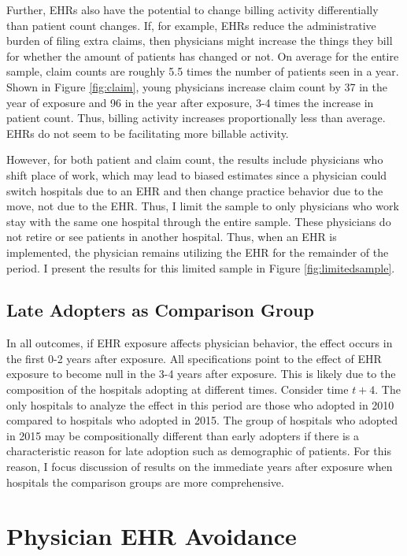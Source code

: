 \documentclass[11pt]{article}
\begin{document}
Further, EHRs also have the potential to change billing activity differentially than patient count changes. If, for example, EHRs reduce the administrative burden of filing extra claims, then physicians might increase the things they bill for whether the amount of patients has changed or not. On average for the entire sample, claim counts are roughly 5.5 times the number of patients seen in a year. Shown in Figure \ref{fig:claim}, young physicians increase claim count by 37 in the year of exposure and 96 in the year after exposure, 3-4 times the increase in patient count. Thus, billing activity increases proportionally less than average. EHRs do not seem to be facilitating more billable activity. 

However, for both patient and claim count, the results include physicians who shift place of work, which may lead to biased estimates since a physician could switch hospitals due to an EHR and then change practice behavior due to the move, not due to the EHR. Thus, I limit the sample to only physicians who work stay with the same one hospital through the entire sample. These physicians do not retire or see patients in another hospital. Thus, when an EHR is implemented, the physician remains utilizing the EHR for the remainder of the period. I present the results for this limited sample in Figure \ref{fig:limitedsample}. 


\subsection{Late Adopters as Comparison Group}

In all outcomes, if EHR exposure affects physician behavior, the effect occurs in the first 0-2 years after exposure. All specifications point to the effect of EHR exposure to become null in the 3-4 years after exposure. This is likely due to the composition of the hospitals adopting at different times. Consider time $t+4$. The only hospitals to analyze the effect in this period are those who adopted in 2010 compared to hospitals who adopted in 2015. The group of hospitals who adopted in 2015 may be compositionally different than early adopters if there is a characteristic reason for late adoption such as demographic of patients. For this reason, I focus discussion of results on the immediate years after exposure when hospitals the comparison groups are more comprehensive. 


\section{Physician EHR Avoidance}
\end{document}
